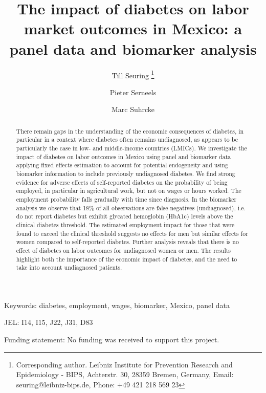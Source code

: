 \documentclass[12pt,english]{article}
\begin{document}
	\title{The impact of diabetes on labor market outcomes in Mexico: a panel data and biomarker analysis}
	
	\author[a,b]{Till Seuring%
		\thanks{Corresponding author. Leibniz Institute for Prevention Research and Epidemiology - BIPS, Achterstr. 30, 28359 Bremen, Germany, Email: seuring@leibniz-bips.de, Phone: +49 421 218 569 23}}
	\author[b]{Pieter Serneels}
	\author[c]{Marc Suhrcke}
	
	\date{}	
	
	
	
	\maketitle 
	
		Keywords: diabetes, employment, wages, biomarker, Mexico, panel data
		
		JEL: I14, I15, J22, J31, D83
		
		Funding statement: No funding was received to support this project.
	\thispagestyle{empty}
	\clearpage
	
	
	\maketitle 

	\clearpage
	
\begin{abstract}
There remain gaps in the understanding of the economic consequences of diabetes, in particular in a context where diabetes often remains undiagnosed, as appears to be particularly the case in low- and middle-income countries (LMICs). We investigate the impact of diabetes on labor outcomes in Mexico using panel and biomarker data applying fixed effects estimation to account for potential endogeneity and using biomarker information to include previously undiagnosed diabetes. We find strong evidence for adverse effects of self-reported diabetes on the probability of being employed, in particular in agricultural work, but not on wages or hours worked. The employment probability falls gradually with time since diagnosis. In the biomarker analysis we observe that 18\% of all observations are false negatives (undiagnosed), i.e. do not report diabetes but exhibit glycated hemoglobin (HbA1c) levels above the clinical diabetes threshold. The estimated employment impact for those that were found to exceed the clinical threshold suggests no effects for men but similar effects for women compared to self-reported diabetes. Further analysis reveals that there is no effect of diabetes on labor outcomes for undiagnosed women or men. The results highlight both the importance of the economic impact of diabetes, and the need to take into account undiagnosed patients.
\end{abstract}
\end{document}
